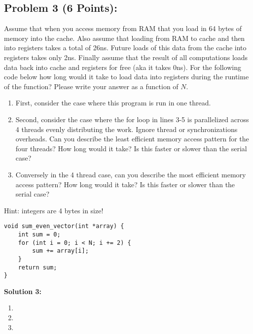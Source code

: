\documentclass[]{article}
\begin{document}
\subsection*{Problem 3 (6 Points):}
Assume that when you access memory from RAM that you load in 64 bytes of memory into the cache. Also assume that loading from RAM to cache and then into registers takes a total of 26ns. Future loads of this data from the cache into registers takes only 2ns. Finally assume that the result of all computations loads data back into cache and registers for free (aka it takes 0ns). For the following code below how long would it take to load data into registers during the runtime of the function? Please write your answer as a function of $N$.
\begin{enumerate}[label=(\alph*)]
    \item First, consider the case where this program is run in one thread.
    \item Second, consider the case where the for loop in lines 3-5 is parallelized across 4 threads evenly distributing the work. Ignore thread or synchronizations overheads. Can you describe the least efficient memory access pattern for the four threads? How long would it take? Is this faster or slower than the serial case?
    \item Conversely in the 4 thread case, can you describe the most efficient memory access pattern? How long would it take? Is this faster or slower than the serial case?
\end{enumerate}
Hint: integers are 4 bytes in size!

\begin{lstlisting}
void sum_even_vector(int *array) {
    int sum = 0;
    for (int i = 0; i < N; i += 2) {
        sum += array[i];
    }
    return sum;
}
\end{lstlisting}

\bigskip
\textbf{Solution 3:}
\begin{enumerate}
    \item %
    \item %
    \item %
\end{enumerate}

\clearpage
\end{document}
